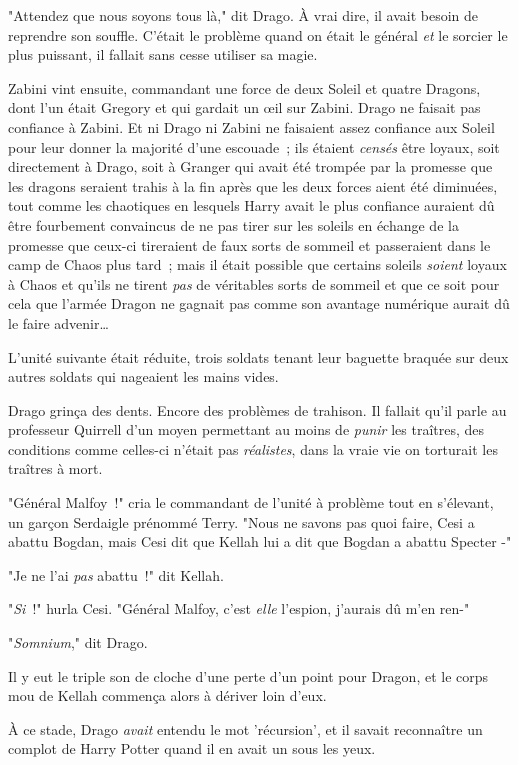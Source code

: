 "Attendez que nous soyons tous là," dit Drago. À vrai dire, il avait besoin de reprendre son souffle. C'était le problème quand on était le général \emph{et} le sorcier le plus puissant, il fallait sans cesse utiliser sa magie.

Zabini vint ensuite, commandant une force de deux Soleil et quatre Dragons, dont l'un était Gregory et qui gardait un œil sur Zabini. Drago ne faisait pas confiance à Zabini. Et ni Drago ni Zabini ne faisaient assez confiance aux Soleil pour leur donner la majorité d'une escouade~; ils étaient \emph{censés} être loyaux, soit directement à Drago, soit à Granger qui avait été trompée par la promesse que les dragons seraient trahis à la fin après que les deux forces aient été diminuées, tout comme les chaotiques en lesquels Harry avait le plus confiance auraient dû être fourbement convaincus de ne pas tirer sur les soleils en échange de la promesse que ceux-ci tireraient de faux sorts de sommeil et passeraient dans le camp de Chaos plus tard~; mais il était possible que certains soleils \emph{soient} loyaux à Chaos et qu'ils ne tirent \emph{pas} de véritables sorts de sommeil et que ce soit pour cela que l'armée Dragon ne gagnait pas comme son avantage numérique aurait dû le faire advenir…

L'unité suivante était réduite, trois soldats tenant leur baguette braquée sur deux autres soldats qui nageaient les mains vides.

Drago grinça des dents. Encore des problèmes de trahison. Il fallait qu'il parle au professeur Quirrell d'un moyen permettant au moins de \emph{punir} les traîtres, des conditions comme celles-ci n'était pas \emph{réalistes}, dans la vraie vie on torturait les traîtres à mort.

"Général Malfoy~!" cria le commandant de l'unité à problème tout en s'élevant, un garçon Serdaigle prénommé Terry. "Nous ne savons pas quoi faire, Cesi a abattu Bogdan, mais Cesi dit que Kellah lui a dit que Bogdan a abattu Specter -"

"Je ne l'ai \emph{pas} abattu~!" dit Kellah.

"\emph{Si}~!" hurla Cesi. "Général Malfoy, c'est \emph{elle} l'espion, j'aurais dû m'en ren-"

"\emph{Somnium}," dit Drago.

Il y eut le triple son de cloche d'une perte d'un point pour Dragon, et le corps mou de Kellah commença alors à dériver loin d'eux.

À ce stade, Drago \emph{avait} entendu le mot 'récursion', et il savait reconnaître un complot de Harry Potter quand il en avait un sous les yeux.

